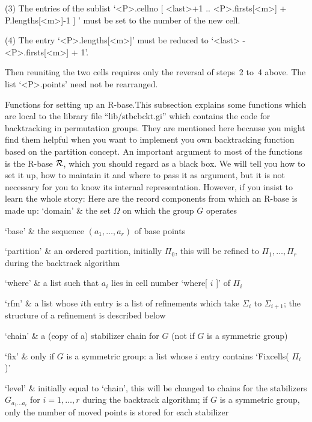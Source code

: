 (3) The entries of the sublist `<P>.cellno{ [ <last>+1 .. <P>.firsts[<m>]
+ P.lengths[<m>]-1 ] }' must be set to the number of the new cell.

(4) The entry    `<P>.lengths[<m>]'  must   be  reduced  to   `<last>   -
<P>.firsts[<m>] + 1'.

Then reuniting the  two cells requires  only the reversal of steps~2 to~4
above. The list `<P>.points' need not be rearranged.

\medskip
{\bsf Functions for setting up  an R-base.}\quad This subsection explains
some  {\GAP}    functions  which   are  local  to    the    library  file
``lib/stbcbckt.gi'' which    contains   the code for      backtracking in
permutation groups.  They are mentioned here  because you might find them
helpful when you want to implement you own backtracking function based on
the partition concept. An important argument  to most of the functions is
the R-base ${\cal R}$, which you should regard as a black box. We will tell you
how to  set it up,  how to maintain it and  where to pass it as argument,
but  it is not  necessary  for you  to know its  internal representation.
However,  if you insist to  learn  the whole  story:  Here are the record
components from which an R-base is made up:
\beginitems
`domain' &
    the set $\Omega$ on which the group $G$ operates

`base' &
    the sequence $(a_1,\ldots,a_r)$ of base points

`partition' &
    an  ordered  partition, initially  $\Pi_0$, this  will be  refined to
    $\Pi_1,\ldots,\Pi_r$ during the backtrack algorithm

`where' &
    a list such that $a_i$ lies in cell number `where[ $i$ ]' of $\Pi_i$

`rfm' &
    a    list whose $i$th entry  is   a  list of   refinements which take
    $\Sigma_i$  to $\Sigma_{i+1}$;  the    structure of a  refinement  is
    described below

`chain' &
    a (copy of a) stabilizer  chain for $G$ (not  if  $G$ is a  symmetric
    group)

`fix' &
    only if  $G$ is a  symmetric group:  a list whose  $i$ entry contains
    `Fixcells( $\Pi_i$ )'

`level' &
    initially equal to `chain',  this will be changed  to chains  for the
    stabilizers  $G_{a_1\dots  a_i}$    for  $i=1,\ldots,r$  during   the
    backtrack algorithm; if $G$ is a  symmetric group, only the number of
    moved points is stored for each stabilizer

